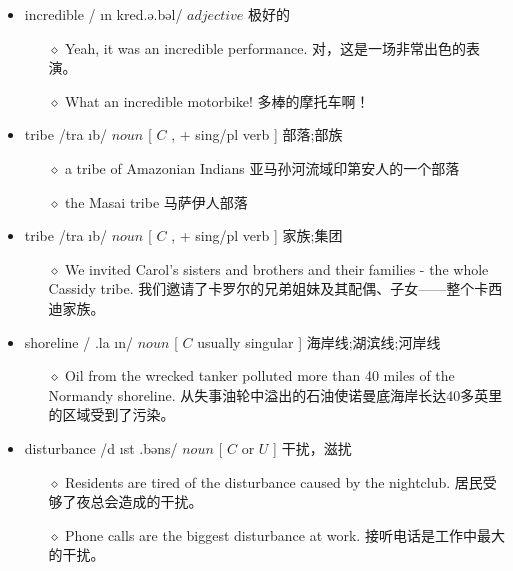 \documentclass[a4paper,top=2.5cm,buttom=2.5cm10.5pt]{book}
\begin{document}
\begin{itemize}
\item incredible / \i n \textprimstress kred.ə.bəl/ $ adjective $  极好的
\begin{itemize}
\item[$\diamond$] Yeah, it was an incredible performance.
对，这是一场非常出色的表演。
\item[$\diamond$] What an incredible motorbike!
多棒的摩托车啊！
\end{itemize}
\end{itemize}
\begin{itemize}
\item tribe /tra \i b/ $ noun $ [  $ C $ ,  + sing/pl verb ] 部落;部族
\begin{itemize}
\item[$\diamond$] a tribe of Amazonian Indians
亚马孙河流域印第安人的一个部落
\item[$\diamond$] the Masai tribe
马萨伊人部落
\end{itemize}
\end{itemize}
\begin{itemize}
\item tribe /tra \i b/ $ noun $ [  $ C $ ,  + sing/pl verb ] 家族;集团
\begin{itemize}
\item[$\diamond$] We invited Carol's sisters and brothers and their families - the whole Cassidy tribe.
我们邀请了卡罗尔的兄弟姐妹及其配偶、子女——整个卡西迪家族。
\end{itemize}
\end{itemize}
\begin{itemize}
\item shoreline / \textprimstress  \textesh  \textopeno  \textlengthmark .la \i n/ $ noun $ [  $ C $  usually singular ] 海岸线;湖滨线;河岸线
\begin{itemize}
\item[$\diamond$] Oil from the wrecked tanker polluted more than 40 miles of the Normandy shoreline.
从失事油轮中溢出的石油使诺曼底海岸长达40多英里的区域受到了污染。
\end{itemize}
\end{itemize}
\begin{itemize}
\item disturbance /d \i  \textprimstress st \textrevepsilon  \textlengthmark .bəns/ $ noun $ [  $ C $  or  $ U $  ] 干扰，滋扰
\begin{itemize}
\item[$\diamond$] Residents are tired of the disturbance caused by the nightclub.
居民受够了夜总会造成的干扰。
\item[$\diamond$] Phone calls are the biggest disturbance at work.
接听电话是工作中最大的干扰。
\end{itemize}
\end{itemize}
\end{document}

